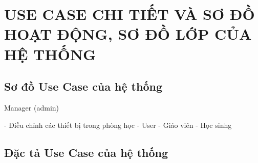 \newpage
\section{USE CASE CHI TIẾT VÀ SƠ ĐỒ HOẠT ĐỘNG, SƠ ĐỒ LỚP CỦA HỆ THỐNG}
\subsection{Sơ đồ Use Case của hệ thống}

Manager (admin)

- Điều chỉnh các thiết bị trong phòng học
- User
- Giáo viên
- Học sinhg



\subsection{Đặc tả Use Case của hệ thống}


